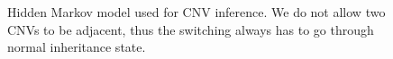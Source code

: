 \begin{figure}[h]
\vspace{10pt}
\hspace{0pt}

\caption{Hidden Markov model used for CNV inference. We do not allow two CNVs to be adjacent, thus the switching always has to go through normal inheritance state.}\label{fig:hmm_main}
\end{figure}
